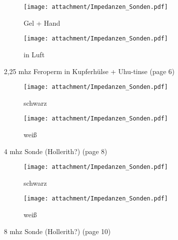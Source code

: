 \begin{figure}[ht!]
	\centering
	\begin{subfigure}[t!]{0.82\textwidth}
	  	\centering
  		\texttt{[image: attachment/Impedanzen\_Sonden.pdf]} %
  		\caption{Gel + Hand}
 		\label{fig:snr_2_script}
  	\end{subfigure}
  	\begin{subfigure}[t!]{0.82\textwidth}
	  	\centering
  		\texttt{[image: attachment/Impedanzen\_Sonden.pdf]} %
  		\caption{in Luft}
 		\label{fig:snr_2_script}
  	\end{subfigure}
  	\caption{2,25 \ac{mhz} Feroperm in Kupferhülse + Uhu-tinse (page 6)}
\end{figure}
\clearpage

\begin{figure}[ht!]
	\centering
	\begin{subfigure}[t!]{0.82\textwidth}
	  	\centering
  		\texttt{[image: attachment/Impedanzen\_Sonden.pdf]} %
  		\caption{schwarz}
 		\label{fig:snr_2_script}
  	\end{subfigure}
  	\begin{subfigure}[t!]{0.82\textwidth}
	  	\centering
  		\texttt{[image: attachment/Impedanzen\_Sonden.pdf]} %
  		\caption{weiß}
 		\label{fig:snr_2_script}
  	\end{subfigure}
  	\caption{4 \ac{mhz} Sonde (Hollerith?) (page 8)}
\end{figure}
\clearpage


\begin{figure}[ht!]
	\centering
	\begin{subfigure}[t!]{0.82\textwidth}
	  	\centering
  		\texttt{[image: attachment/Impedanzen\_Sonden.pdf]} %
  		\caption{schwarz}
 		\label{fig:snr_2_script}
  	\end{subfigure}
  	\begin{subfigure}[t!]{0.82\textwidth}
	  	\centering
  		\texttt{[image: attachment/Impedanzen\_Sonden.pdf]} %
  		\caption{weiß}
 		\label{fig:snr_2_script}
  	\end{subfigure}
  	\caption{8 \ac{mhz} Sonde (Hollerith?) (page 10)}
\end{figure}
\clearpage


